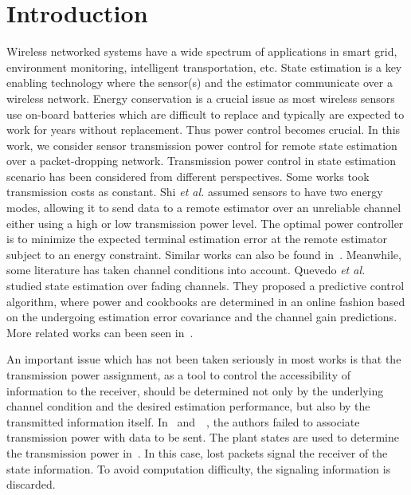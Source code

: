 \documentclass[twocolumn]{autart}    \usepackage{cite}
\begin{document}
\section{Introduction}\label{sec:intro}
{Wireless networked systems have a wide spectrum of applications in smart grid, environment monitoring,
intelligent transportation, etc.
State estimation is a key enabling technology where
the sensor(s) and the estimator communicate over a wireless network.
 Energy conservation is a crucial issue as most wireless sensors use on-board
 batteries which are difficult to replace and typically are expected to work for years without replacement.
Thus power control becomes crucial.
In this work, we consider sensor transmission power control for remote state
estimation over a packet-dropping network.
{Transmission power control in state estimation scenario has been considered
from different perspectives. Some works took transmission costs as constant.}
Shi \textit{et al.} \cite{shi2012optimal}
assumed sensors to have two energy
modes, allowing it to send
data to a remote estimator over an unreliable
channel either using a high or low transmission power
level. The optimal power controller is
to minimize the expected terminal estimation error at the remote estimator subject to an energy
constraint.
Similar works can also be found in~\cite{xu2004optimal,Imer05CDC}.
Meanwhile, some literature has taken channel conditions
into account.
Quevedo \textit{et al.}~\cite{queahl10} studied state estimation over fading channels.
They proposed a predictive control algorithm,
where power and cookbooks are determined in an online fashion based on
the undergoing estimation error covariance and the channel gain predictions.
{More related works can been
 seen in~\cite{leong2012power,nouleo14,quevedo2012kalman}.}

{An important issue which has not been taken seriously in most
works is that the transmission power assignment, as a tool to
control the accessibility of information to the receiver,
should be determined not only by the underlying channel condition and
the desired estimation performance, but also by the transmitted
information itself.
In~\cite{queahl10} and~~\cite{leong2012power},
the authors failed to associate transmission power with data to be sent.
The plant states are used to determine the transmission power in~\cite{GatsisACC13}.
In this case, lost packets signal the receiver of the state information. To avoid computation difficulty, the signaling information is discarded.}

}
\end{document}
